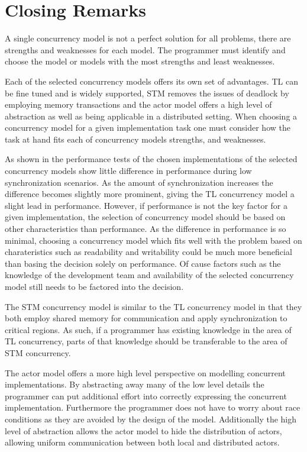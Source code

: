 \section{Closing Remarks}\label{sec:choose_closing}
A single concurrency model is not a perfect solution for all problems, there are strengths and weaknesses for each model. The programmer must identify and choose the model or models with the most strengths and least weaknesses. 

Each of the selected concurrency models offers its own set of advantages. \ac{TL} can be fine tuned and is widely supported, \ac{STM} removes the issues of deadlock by employing memory transactions and the actor model offers a high level of abstraction as well as being applicable in a distributed setting. When choosing a concurrency model for a given implementation task one must consider how the task at hand fits each of concurrency models strengths, and weaknesses.

As shown in the performance tests of  the chosen implementations of the selected concurrency models show little difference in performance during low synchronization scenarios. As the amount of synchronization increases the difference becomes slightly more prominent, giving the \ac{TL} concurrency model a slight lead in performance. However, if performance is not the key factor for a given implementation, the selection of concurrency model should be based on other characteristics than performance. As the difference in performance is so minimal, choosing a concurrency model which fits well with the problem based on charateristics such as readability and writability could be much more beneficial than basing the decision solely on performance. Of cause factors such as the knowledge of the development team and availability of the selected concurrency model still needs to be factored into the decision.

The \ac{STM} concurrency model is similar to the \ac{TL} concurrency model in that they both employ shared memory for communication and apply synchronization to critical regions. As such, if a programmer has existing knowledge in the area of \ac{TL} concurrency, parts of that knowledge should be transferable to the area of \ac{STM} concurrency.

The actor model offers a more high level perspective on modelling concurrent implementations. By abstracting away many of the low level details the programmer can put additional effort into correctly expressing the concurrent implementation. Furthermore the programmer does not have to worry about race conditions as they are avoided by the design of the model. Additionally the high level of abstraction allows the actor model to hide the distribution of actors, allowing uniform communication between both local and distributed actors. 





\worksheetend